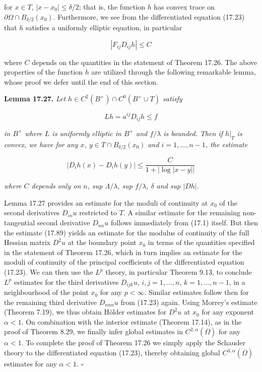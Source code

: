 
for $x \in T$, $|x - x_0| \leq \delta/2$; that is, the function $h$ has convex trace on $\partial \Omega \cap B_{\delta/2}(x_0)$. Furthermore, we see from the differentiated equation (17.23) that $h$ satisfies a uniformly elliptic equation, in particular

\[
|F_{ij} D_{ij} h| \leq C
\]

where $C$ depends on the quantities in the statement of Theorem 17.26. The above properties of the function $h$ are utilized through the following remarkable lemma, whose proof we defer until the end of this section.

\textbf{Lemma 17.27.} \emph{Let $h \in C^2(B^+) \cap C^0(B^+ \cup T)$ satisfy}

\begin{equation}
\tag{17.91}
Lh = a^{ij}D_{ij}h \leq f
\end{equation}

\emph{in $B^+$ where $L$ is uniformly elliptic in $B^+$ and $f/\lambda$ is bounded. Then if $h|_T$ is convex, we have for any $x$, $y \in T \cap B_{\delta/2}(x_0)$ and $i=1,\ldots,n-1$, the estimate}

\begin{equation}
\tag{17.92}
|D_i h(x) - D_i h(y)| \leq \frac{C}{1 + |\log |x-y||}
\end{equation}

\emph{where $C$ depends only on $n$, sup $\Lambda/\lambda$, sup $f/\lambda$, $\delta$ and sup $|Dh|$.}

Lemma 17.27 provides an estimate for the moduli of continuity at $x_0$ of the second derivatives $D_{in}u$ restricted to $T$. A similar estimate for the remaining non-tangential second derivative $D_{nn}u$ follows immediately from (17.1) itself. But then the estimate (17.89) yields an estimate for the modulus of continuity of the full Hessian matrix $D^2u$ at the boundary point $x_0$ in terms of the quantities specified in the statement of Theorem 17.26, which in turn implies an estimate for the moduli of continuity of the principal coefficients of the differentiated equation (17.23). We can then use the $L^p$ theory, in particular Theorem 9.13, to conclude $L^p$ estimates for the third derivatives $D_{ijk}u$, $i,j=1,\ldots,n$, $k=1,\ldots,n-1$, in a neighbourhood of the point $x_0$ for any $p < \infty$. Similar estimates follow then for the remaining third derivative $D_{nnn}u$ from (17.23) again. Using Morrey's estimate (Theorem 7.19), we thus obtain Hölder estimates for $D^2u$ at $x_0$ for any exponent $\alpha < 1$. On combination with the interior estimate (Theorem 17.14), as in the proof of Theorem 8.29, we finally infer global estimates in $C^{2,\alpha}(\overline{\Omega})$ for any $\alpha < 1$. To complete the proof of Theorem 17.26 we simply apply the Schauder theory to the differentiated equation (17.23), thereby obtaining global $C^{3,\alpha}(\overline{\Omega})$ estimates for any $\alpha < 1$. $\square$


